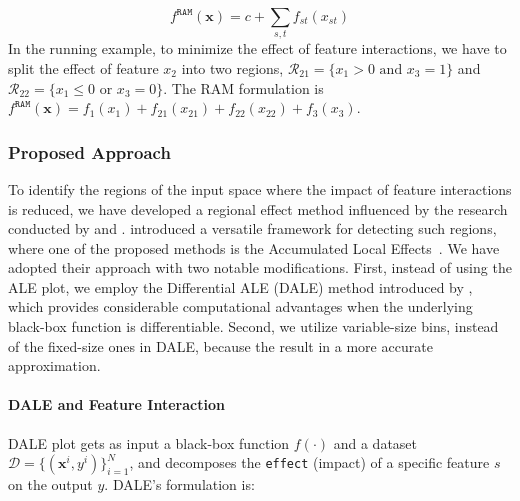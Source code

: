 \documentclass[12pt]{article}
\newcommand{\xb}{\mathbf{x}}
\begin{document}
\begin{equation}
\label{eq:ram_formulation2}
f^{\mathtt{RAM}}(\xb) = c + \sum_{s,t} f_{st}(x_{st})
\end{equation}
%
In the running example, to minimize the effect of feature interactions, we have to split the effect of feature \(x_2\) into two regions,
\(\mathcal{R}_{21} = \{x_1 > 0 \text{ and } x_3 = 1\}\) and \(\mathcal{R}_{22} = \{x_1 \leq 0 \text{ or } x_3 = 0\}\).
The RAM formulation is \(f^{\mathtt{RAM}}(\xb) = f_1(x_1) + f_{21}(x_{21}) + f_{22}(x_{22}) + f_3(x_3)\).


\subsubsection{Proposed Approach}

To identify the regions of the input space where the impact of feature interactions is reduced,
we have developed a regional effect method influenced by the research conducted by
\citet{herbinger2023decomposing} and \citet{gkolemis2023dale}.
\citet{herbinger2023decomposing} introduced a versatile framework for detecting such regions,
where one of the proposed methods is the Accumulated Local Effects~\citep{apley2020visualizing}.
We have adopted their approach with two notable modifications.
First, instead of using the ALE plot, we employ the Differential ALE (DALE) method introduced by \citet{gkolemis2023dale},
which provides considerable computational advantages when the underlying black-box function is differentiable.
Second, we utilize variable-size bins, instead of the fixed-size ones in DALE, because the result in a more accurate approximation.

\paragraph{DALE and Feature Interaction}

DALE plot gets as input a black-box function \(f(\cdot)\) and a dataset \(\mathcal{D} = \{(\xb^i, y^i)\}_{i=1}^N\),
and decomposes the \texttt{effect} (impact) of a specific feature $s$ on the output $y$.
DALE's formulation is:
\end{document}
